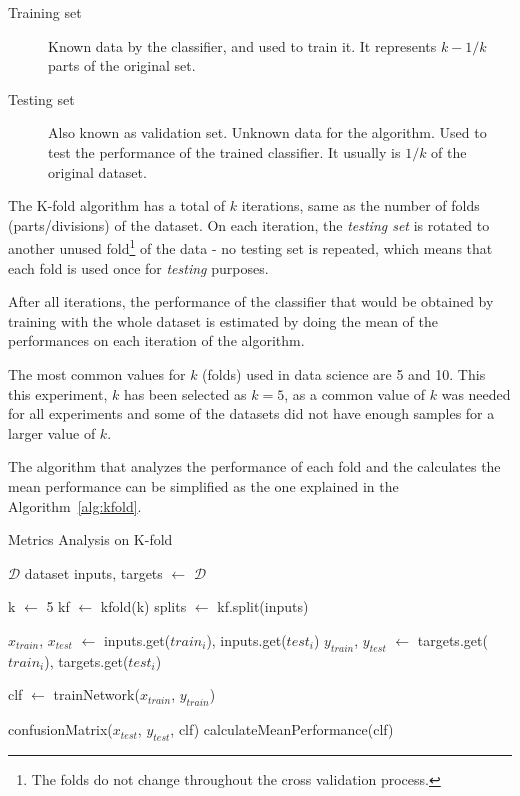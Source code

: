 \begin{description}
    \item [Training set] Known data by the classifier, and used to train it. It 
    represents $k - 1 / k$ parts of the original set.
    \item [Testing set] Also known as validation set. Unknown data for the 
    algorithm. Used to test the performance of the trained classifier. It 
    usually is $1 / k$ of the original dataset.
\end{description}

The K-fold algorithm has a total of $k$ iterations, same as the number of folds 
(parts/divisions) of the dataset. On each iteration, the \textit{testing 
set} is rotated to another unused fold\footnote{The folds do not change 
throughout the cross validation process.} of the data - no testing set is 
repeated, which means that each fold is used once for \textit{testing} 
purposes. 

After all iterations, the performance of the classifier that would be obtained 
by training with the whole dataset is estimated by doing the mean of the
performances on each iteration of the algorithm. 

The most common values for $k$ (folds) used in data science are 5 and 10. This 
this experiment, $k$ has been selected as $k=5$, as a common value of $k$ was 
needed for all experiments and some of the datasets did not have enough 
samples for a larger value of $k$.

The algorithm that analyzes the performance of each fold and the calculates 
the mean performance can be simplified as the one explained in the 
Algorithm~\ref{alg:kfold}.

\begin{breakablealgorithm}
    \caption{Metrics Analysis on K-fold}
    \footnotesize
    \label{alg:kfold}
    \begin{algorithmic}[1]
        \Require $\mathcal{D}$ dataset
        \State inputs, targets $\leftarrow$ $\mathcal{D}$
    
        \State k $\leftarrow$ 5
        \State kf $\leftarrow$ kfold(k)
        \State splits $\leftarrow$ kf.split(inputs)
        
        	\State $x_{train}$, $x_{test}$ $\leftarrow$ inputs.get($train_{i}$), inputs.get($test_{i}$)
        	\State $y_{train}$, $y_{test}$ $\leftarrow$ targets.get($train_{i}$), targets.get($test_{i}$)
        	
        	\State clf $\leftarrow$ trainNetwork($x_{train}$, $y_{train}$)
        	
        	\State confusionMatrix($x_{test}$, $y_{test}$, clf)
        \EndFor
        \State calculateMeanPerformance(clf)
    \end{algorithmic}
\end{breakablealgorithm}

